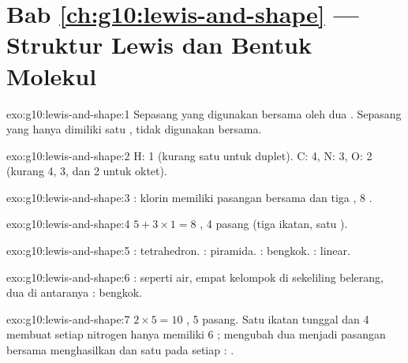 \section*{Bab \ref{ch:g10:lewis-and-shape} --- Struktur Lewis dan Bentuk Molekul}

\begin{solution}{exo:g10:lewis-and-shape:1}
Sepasang  yang digunakan bersama oleh dua . Sepasang
 yang hanya dimiliki satu , tidak digunakan bersama.
\end{solution}

\begin{solution}{exo:g10:lewis-and-shape:2}
H: 1 (kurang satu  untuk duplet). C: 4, N: 3, O: 2 (kurang 4, 3,
dan 2  untuk oktet).
\end{solution}

\begin{solution}{exo:g10:lewis-and-shape:3}
: klorin memiliki pasangan bersama dan tiga
, 8 .
\end{solution}

\begin{solution}{exo:g10:lewis-and-shape:4}
$5 + 3 \times 1 = 8$ , 4 pasang (tiga ikatan, satu ).
\end{solution}

\begin{solution}{exo:g10:lewis-and-shape:5}
: tetrahedron. : piramida. : bengkok.
: linear.
\end{solution}

\begin{solution}{exo:g10:lewis-and-shape:6}
: seperti air, empat kelompok di sekeliling belerang,
dua di antaranya : bengkok.
\end{solution}

\begin{solution}{exo:g10:lewis-and-shape:7}
$2 \times 5 = 10$ , 5 pasang. Satu ikatan tunggal dan 4
 membuat setiap nitrogen hanya memiliki 6 ;
mengubah dua  menjadi pasangan bersama menghasilkan
 dan satu  pada setiap :
.
\end{solution}

